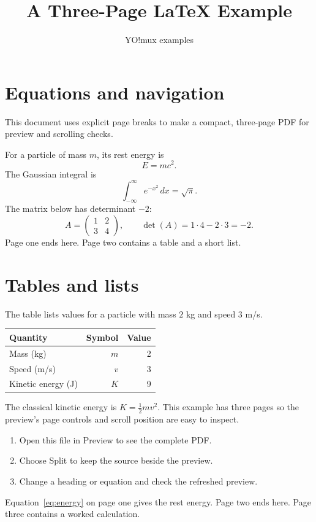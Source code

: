 \documentclass[11pt]{article}
\title{A Three-Page LaTeX Example}
\author{YO!mux examples}
\date{}
\begin{document}
\maketitle

\section{Equations and navigation}
This document uses explicit page breaks to make a compact, three-page PDF for
preview and scrolling checks.

For a particle of mass $m$, its rest energy is
\begin{equation}
E = mc^2.
\label{eq:energy}
\end{equation}
The Gaussian integral is
\[
\int_{-\infty}^{\infty} e^{-x^2}\,dx = \sqrt{\pi}.
\]
The matrix below has determinant $-2$:
\[
A = \begin{pmatrix}1 & 2 \\ 3 & 4\end{pmatrix},
\qquad \det(A) = 1\cdot4 - 2\cdot3 = -2.
\]
\vfill
Page one ends here. Page two contains a table and a short list.

\newpage
\section{Tables and lists}
The table lists values for a particle with mass $2$ kg and speed $3$ m/s.
\begin{center}
\begin{tabular}{lrr}
\hline
Quantity & Symbol & Value \\
\hline
Mass (kg) & $m$ & 2 \\
Speed (m/s) & $v$ & 3 \\
Kinetic energy (J) & $K$ & 9 \\
\hline
\end{tabular}
\end{center}
The classical kinetic energy is $K=\tfrac12 mv^2$. This example has three
pages so the preview's page controls and scroll position are easy to inspect.
\begin{enumerate}
\item Open this file in Preview to see the complete PDF.
\item Choose Split to keep the source beside the preview.
\item Change a heading or equation and check the refreshed preview.
\end{enumerate}
Equation~\eqref{eq:energy} on page one gives the rest energy.
\vfill
Page two ends here. Page three contains a worked calculation.
\end{document}
